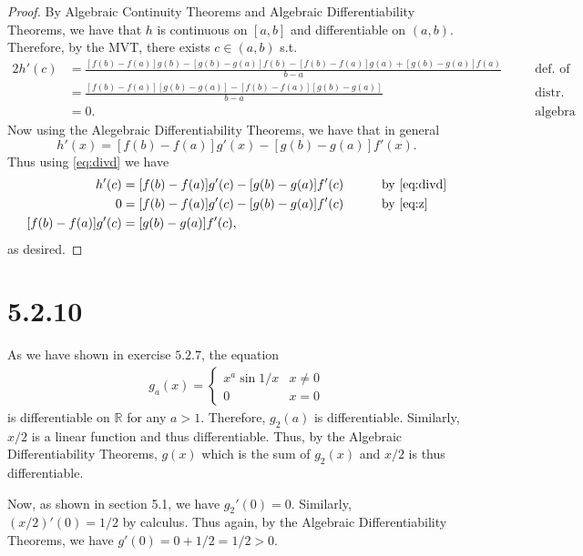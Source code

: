 \documentclass[10pt]{article}
\begin{document}
\begin{proof}
    By Algebraic Continuity Theorems and Algebraic Differentiability Theorems, we have that $h$ is continuous on $[a,b]$ and differentiable on $(a,b).$ Therefore, by the MVT, there exists $c\in(a,b)$ s.t.
    \begin{alignat}{2}
        h'(c) &= \frac{[f(b)-f(a)]g(b)-[g(b)-g(a)]f(b)-[f(b)-f(a)]g(a)+[g(b)-g(a)]f(a)}{b-a} \quad&&\text{def. of MVT}\nonumber\\
        &= \frac{[f(b)-f(a)][g(b)-g(a)]-[f(b)-f(a)][g(b)-g(a)]}{b-a} &&\text{distr. prop.}\nonumber\\
        &= 0. &&\text{algebra} \label{eq:z}
    \end{alignat}
    Now using the Alegebraic Differentiability Theorems, we have that in general
    \begin{equation} \label{eq:divd}
        h'(x) = [f(b)-f(a)]g'(x)-[g(b)-g(a)]f'(x).
    \end{equation}
    Thus using \eqref{eq:divd} we have
    \begin{alignat*}{2}
        h'(c) &= [f(b)-f(a)]g'(c)-[g(b)-g(a)]f'(c) &&\text{by \eqref{eq:divd}}\\
        0 &= [f(b)-f(a)]g'(c)-[g(b)-g(a)]f'(c) \qquad&&\text{by \eqref{eq:z}}\\
        [f(b)-f(a)]g'(c) &=[g(b)-g(a)]f'(c),
    \end{alignat*}
    as desired.
\end{proof}

\section*{5.2.10}

As we have shown in exercise $5.2.7$, the equation 
\begin{align*}
    g_a(x)=\begin{cases}
        x^a\sin 1/x&x\neq 0\\
        0&x=0
    \end{cases}
\end{align*}
is differentiable on $\mathbb{R}$ for any $a>1$. Therefore, $g_2(a)$ is differentiable. Similarly, $x/2$ is a linear function and thus differentiable. Thus, by the Algebraic Differentiability Theorems, $g(x)$ which is the sum of $g_2(x)$ and $x/2$ is thus differentiable.

Now, as shown in section 5.1, we have $g_2'(0)=0$. Similarly, $(x/2)'(0) = 1/2$ by calculus. Thus again, by the Algebraic Differentiability Theorems, we have $g'(0) = 0 + 1/2 = 1/2>0.$
\end{document}
